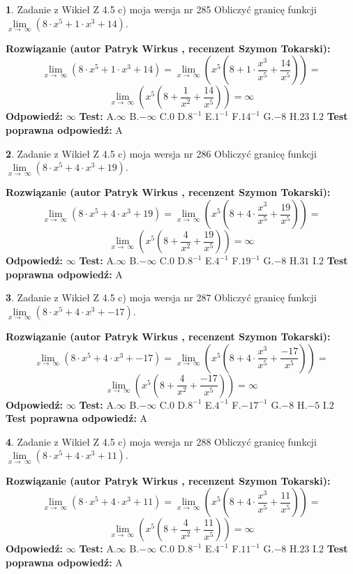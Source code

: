 \documentclass[12pt, a4paper]{article}
\theoremstyle{definition} %
\newtheorem{zad}{}
\newcommand{\zadStart}[1]{\begin{zad}#1\newline}
\newcommand{\zadStop}{\end{zad}}
\newcommand{\rozwStart}[2]{\noindent \textbf{Rozwiązanie (autor #1 , recenzent #2): }\newline}
\newcommand{\rozwStop}{\newline}
\newcommand{\odpStart}{\noindent \textbf{Odpowiedź:}\newline}
\newcommand{\odpStop}{\newline}
\newcommand{\testStart}{\noindent \textbf{Test:}\newline}
\newcommand{\testStop}{\newline}
\newcommand{\kluczStart}{\noindent \textbf{Test poprawna odpowiedź:}\newline}
\newcommand{\kluczStop}{\newline}
\begin{document}
\zadStart{Zadanie z Wikieł Z 4.5 c) moja wersja nr 285}
Obliczyć granicę funkcji  $\lim\limits_{x\to\ \infty}(8 \cdot x^{5}+1 \cdot x^{3}+14)$.
\zadStop
\rozwStart{Patryk Wirkus}{Szymon Tokarski}
$$\lim\limits_{x\to\ \infty}(8 \cdot x^{5}+1 \cdot x^{3}+14) = \lim\limits_{x\to\ \infty}(x^{5}(8 +1 \cdot \frac{x^{3}}{x^{5}}+\frac{14}{x^{5}})) =$$ $$\lim\limits_{x\to\ \infty}(x^{5}(8 +\frac{1}{x^{2}}+\frac{14}{x^{5}})) =\infty$$
\rozwStop
\odpStart
$\infty$
\odpStop
\testStart
A.$\infty$ B.$-\infty$ C.$0$ D.$8^{-1}$ E.$1^{-1}$
F.$14^{-1}$ G.$-8$
H.$23$
I.$2$
\testStop
\kluczStart
A
\kluczStop



\zadStart{Zadanie z Wikieł Z 4.5 c) moja wersja nr 286}
Obliczyć granicę funkcji  $\lim\limits_{x\to\ \infty}(8 \cdot x^{5}+4 \cdot x^{3}+19)$.
\zadStop
\rozwStart{Patryk Wirkus}{Szymon Tokarski}
$$\lim\limits_{x\to\ \infty}(8 \cdot x^{5}+4 \cdot x^{3}+19) = \lim\limits_{x\to\ \infty}(x^{5}(8 +4 \cdot \frac{x^{3}}{x^{5}}+\frac{19}{x^{5}})) =$$ $$\lim\limits_{x\to\ \infty}(x^{5}(8 +\frac{4}{x^{2}}+\frac{19}{x^{5}})) =\infty$$
\rozwStop
\odpStart
$\infty$
\odpStop
\testStart
A.$\infty$ B.$-\infty$ C.$0$ D.$8^{-1}$ E.$4^{-1}$
F.$19^{-1}$ G.$-8$
H.$31$
I.$2$
\testStop
\kluczStart
A
\kluczStop



\zadStart{Zadanie z Wikieł Z 4.5 c) moja wersja nr 287}
Obliczyć granicę funkcji  $\lim\limits_{x\to\ \infty}(8 \cdot x^{5}+4 \cdot x^{3}+-17)$.
\zadStop
\rozwStart{Patryk Wirkus}{Szymon Tokarski}
$$\lim\limits_{x\to\ \infty}(8 \cdot x^{5}+4 \cdot x^{3}+-17) = \lim\limits_{x\to\ \infty}(x^{5}(8 +4 \cdot \frac{x^{3}}{x^{5}}+\frac{-17}{x^{5}})) =$$ $$\lim\limits_{x\to\ \infty}(x^{5}(8 +\frac{4}{x^{2}}+\frac{-17}{x^{5}})) =\infty$$
\rozwStop
\odpStart
$\infty$
\odpStop
\testStart
A.$\infty$ B.$-\infty$ C.$0$ D.$8^{-1}$ E.$4^{-1}$
F.$-17^{-1}$ G.$-8$
H.$-5$
I.$2$
\testStop
\kluczStart
A
\kluczStop



\zadStart{Zadanie z Wikieł Z 4.5 c) moja wersja nr 288}
Obliczyć granicę funkcji  $\lim\limits_{x\to\ \infty}(8 \cdot x^{5}+4 \cdot x^{3}+11)$.
\zadStop
\rozwStart{Patryk Wirkus}{Szymon Tokarski}
$$\lim\limits_{x\to\ \infty}(8 \cdot x^{5}+4 \cdot x^{3}+11) = \lim\limits_{x\to\ \infty}(x^{5}(8 +4 \cdot \frac{x^{3}}{x^{5}}+\frac{11}{x^{5}})) =$$ $$\lim\limits_{x\to\ \infty}(x^{5}(8 +\frac{4}{x^{2}}+\frac{11}{x^{5}})) =\infty$$
\rozwStop
\odpStart
$\infty$
\odpStop
\testStart
A.$\infty$ B.$-\infty$ C.$0$ D.$8^{-1}$ E.$4^{-1}$
F.$11^{-1}$ G.$-8$
H.$23$
I.$2$
\testStop
\kluczStart
A
\kluczStop
\end{document}
